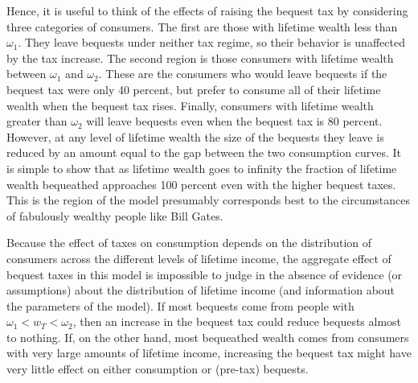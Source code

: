 \documentclass[titlepage,12pt]{article}
\begin{document}
Hence, it is useful to think of the effects of raising the bequest tax 
by considering three categories of consumers.  The first are those 
with lifetime wealth less than $\omega_{1}$.  They leave bequests 
under neither tax regime, so their behavior is unaffected by the tax 
increase.  The second region is those consumers with lifetime wealth 
between $\omega_{1}$ and $\omega_{2}$.  These are the consumers who 
would leave bequests if the bequest tax were only 40 percent, but 
prefer to consume all of their lifetime wealth when the bequest tax 
rises.  Finally, consumers with lifetime wealth greater than 
$\omega_{2}$ will leave bequests even when the bequest tax is 80 
percent.  However, at any level of lifetime wealth the size of the 
bequests they leave is reduced by an amount equal to the gap between 
the two consumption curves.  It is simple to show that as lifetime 
wealth goes to infinity the fraction of lifetime wealth bequeathed 
approaches 100 percent even with the higher bequest taxes.  This is 
the region of the model presumably corresponds best to the 
circumstances of fabulously wealthy people like Bill Gates.

\hypertarget{BequestTaxes}{}


Because the effect of taxes on consumption depends on the distribution 
of consumers across the different levels of lifetime income, the 
aggregate effect of bequest taxes in this model is impossible to judge 
in the absence of evidence (or assumptions) about the distribution of 
lifetime income (and information about the parameters of the model).  
If most bequests come from people with $\omega_{1} < w_{T} < 
\omega_{2}$, then an increase in the bequest tax could reduce bequests 
almost to nothing.  If, on the other hand, most bequeathed wealth 
comes from consumers with very large amounts of lifetime income, 
increasing the bequest tax might have very little effect on either 
consumption or (pre-tax) bequests.
\end{document}
